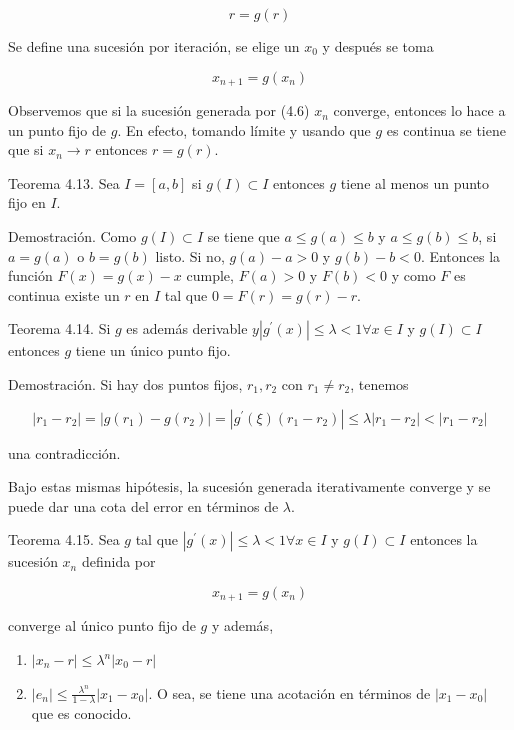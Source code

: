 \documentclass[10pt]{article}
\begin{document}
$$
r=g(r)
$$

Se define una sucesión por iteración, se elige un $x_{0}$ y después se toma


\begin{equation*}
x_{n+1}=g\left(x_{n}\right) \tag{4.6}
\end{equation*}


Observemos que si la sucesión generada por (4.6) $x_{n}$ converge, entonces lo hace a un punto fijo de $g$. En efecto, tomando límite y usando que $g$ es continua se tiene que si $x_{n} \rightarrow r$ entonces $r=g(r)$.

Teorema 4.13. Sea $I=[a, b]$ si $g(I) \subset I$ entonces $g$ tiene al menos un punto fijo en $I$.

Demostración. Como $g(I) \subset I$ se tiene que $a \leq g(a) \leq b$ y $a \leq g(b) \leq b$, si $a=g(a)$ o $b=g(b)$ listo. Si no, $g(a)-a>0$ y $g(b)-b<0$. Entonces la función $F(x)=g(x)-x$ cumple, $F(a)>0$ y $F(b)<0$ y como $F$ es continua existe un $r$ en $I$ tal que $0=F(r)=g(r)-r$.

Teorema 4.14. Si $g$ es además derivable $y\left|g^{\prime}(x)\right| \leq \lambda<1 \forall x \in I$ y $g(I) \subset I$ entonces $g$ tiene un único punto fijo.

Demostración. Si hay dos puntos fijos, $r_{1}, r_{2}$ con $r_{1} \neq r_{2}$, tenemos

$$
\left|r_{1}-r_{2}\right|=\left|g\left(r_{1}\right)-g\left(r_{2}\right)\right|=\left|g^{\prime}(\xi)\left(r_{1}-r_{2}\right)\right| \leq \lambda\left|r_{1}-r_{2}\right|<\left|r_{1}-r_{2}\right|
$$

una contradicción.

Bajo estas mismas hipótesis, la sucesión generada iterativamente converge y se puede dar una cota del error en términos de $\lambda$.

Teorema 4.15. Sea $g$ tal que $\left|g^{\prime}(x)\right| \leq \lambda<1 \forall x \in I$ y $g(I) \subset I$ entonces la sucesión $x_{n}$ definida por

$$
x_{n+1}=g\left(x_{n}\right)
$$

converge al único punto fijo de $g$ y además,

\begin{enumerate}
  \item $\left|x_{n}-r\right| \leq \lambda^{n}\left|x_{0}-r\right|$
  \item $\left|e_{n}\right| \leq \frac{\lambda^{n}}{1-\lambda}\left|x_{1}-x_{0}\right|$. O sea, se tiene una acotación en términos de $\left|x_{1}-x_{0}\right|$ que es conocido.
\end{enumerate}
\end{document}
